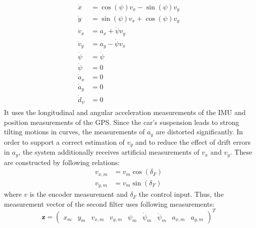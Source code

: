 \begin{align}
\begin{split}\label{eq:dynKalman}
    \dot x &= \cos(\psi) v_x - \sin(\psi) v_y\\
    \dot y &= \sin(\psi) v_x + \cos(\psi) v_y\\
    \dot v_x &= a_x + \dot \psi v_y\\
    \dot v_y &= a_y - \dot \psi v_x\\
    \dot \psi &= \dot \psi\\
    \ddot \psi  &= 0\\
    \dot a_x &= 0\\
    \dot a_y &= 0\\
    \dot d_\psi &= 0
\end{split}
\end{align}
It uses the longitudinal and angular acceleration measurements of the IMU and position measurements of the GPS. Since the car's suspension leads to strong tilting motions in curves, the measurements of $a_y$ are distorted significantly. In order to support a correct estimation of $v_y$ and to reduce the effect of drift errors in $a_y$, the system additionally receives artificial measurements of $v_x$ and $v_y$. These are constructed by following relations:
\begin{align*}
v_{x,m} &= v_m\cos(\delta_F)\\
v_{y,m} &= v_m\sin(\delta_F)
\end{align*}
where $v$ is the encoder measurement and $\delta_F$ the control input.
Thus, the measurement vector of the second filter uses following measurements:
\begin{equation}
\bm{z}=\begin{pmatrix}x_m&y_m&v_{x,m}&v_{y,m}&\psi_m&\dot\psi_m&\ddot\psi_m&a_{x,m}&a_{y,m}\end{pmatrix}^T
\end{equation}
